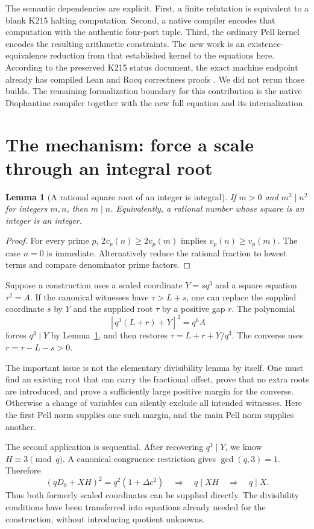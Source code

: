 \documentclass[11pt,a4paper]{article}
\newtheorem{lemma}[theorem]{Lemma}
\theoremstyle{remark}
\begin{document}
The semantic dependencies are explicit. First, a finite refutation is
equivalent to a blank K215 halting computation. Second, a native compiler
encodes that computation with the authentic four-port tuple. Third, the
ordinary Pell kernel encodes the resulting arithmetic constraints. The
new work is an existence-equivalence reduction from that established
kernel to the equations here. According to the preserved K215 status
document, the exact machine endpoint already has compiled Lean and Rocq
correctness proofs \cite{k215}. We did not rerun those builds. The remaining
formalization boundary for this contribution is the native Diophantine
compiler together with the new full equation and its internalization.

\section{The mechanism: force a scale through an integral root}
\label{sec:mechanism}

\begin{lemma}[A rational square root of an integer is integral]
\label{lem:integral}
If $m>0$ and $m^2\mid n^2$ for integers $m,n$, then $m\mid n$.
Equivalently, a rational number whose square is an integer is an integer.
\end{lemma}
\begin{proof}
For every prime $p$, $2v_p(n)\ge2v_p(m)$ implies
$v_p(n)\ge v_p(m)$. The case $n=0$ is immediate. Alternatively reduce the
rational fraction to lowest terms and compare denominator prime factors.
\end{proof}

Suppose a construction uses a scaled coordinate $Y=sq^3$ and a square
equation $\tau^2=A$. If the canonical witnesses have
$\tau>L+s$, one can replace the supplied coordinate $s$ by $Y$ and the
supplied root $\tau$ by a positive gap $r$. The polynomial
\[
 [q^3(L+r)+Y]^2=q^6A
\]
forces $q^3\mid Y$ by Lemma~\ref{lem:integral}, and then restores
$\tau=L+r+Y/q^3$. The converse uses $r=\tau-L-s>0$.

The important issue is not the elementary divisibility lemma by itself.
One must find an existing root that can carry the fractional offset, prove
that no extra roots are introduced, and prove a sufficiently large positive
margin for the converse. Otherwise a change of variables can silently
exclude all intended witnesses. Here the first Pell norm supplies one such
margin, and the main Pell norm supplies another.

The second application is sequential. After recovering $q^3\mid Y$, we
know $H\equiv3\pmod q$. A canonical congruence restriction gives
$\gcd(q,3)=1$. Therefore
\[
 (qD_0+XH)^2=q^2(1+\Delta c^2)
 \quad\Longrightarrow\quad q\mid XH
 \quad\Longrightarrow\quad q\mid X.
\]
Thus both formerly scaled coordinates can be supplied directly. The
divisibility conditions have been transferred into equations already
needed for the construction, without introducing quotient unknowns.
\end{document}
